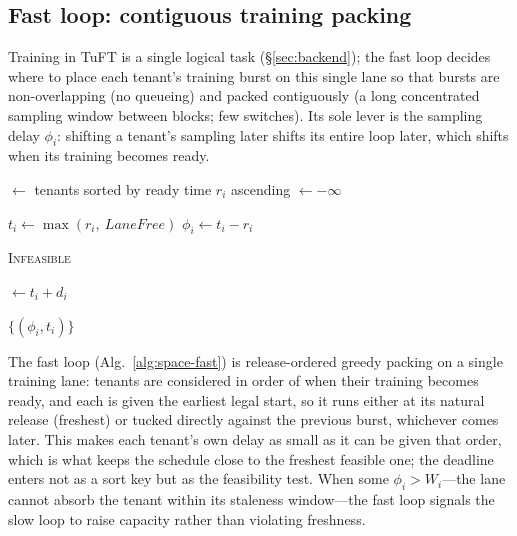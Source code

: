 \subsection{Fast loop: contiguous training packing}
\label{sec:sched:fast}

Training in TuFT is a single logical task (\S\ref{sec:backend}); the fast loop
decides where to place each tenant's training burst on this single lane so that
bursts are non-overlapping (no queueing) and packed contiguously (a long
concentrated sampling window between blocks; few switches). Its sole lever is
the sampling delay $\phi_i$: shifting a tenant's sampling later shifts its
entire loop later, which shifts when its training becomes ready.

\begin{algorithm}[t]
\small
\begin{algorithmic}[1]

         $\leftarrow$ tenants sorted by ready time $r_i$ ascending
         $\leftarrow -\infty$ 

            \State $t_i \leftarrow \max(r_i,\ \mathit{LaneFree})$ 
            \State $\phi_i \leftarrow t_i - r_i$ 

                \State \Return \textsc{Infeasible} 
            \EndIf

             $\leftarrow t_i + d_i$
        \EndFor

        \State \Return $\{(\phi_i, t_i)\}$
    \EndFunction

\end{algorithmic}
\caption{Fast loop: sampling-delay assignment.}
\label{alg:space-fast}
\end{algorithm}

The fast loop (Alg.~\ref{alg:space-fast}) is release-ordered greedy packing on a single
training lane: tenants are considered in order of when their training becomes ready, and
each is given the earliest legal start, so it runs either at its natural release
(freshest) or tucked directly against the previous burst, whichever comes later. This
makes each tenant's own delay as small as it can be given that order, which is what keeps
the schedule close to the freshest feasible one; the deadline enters not as a sort key but
as the feasibility test. When some $\phi_i > W_i$---the lane cannot absorb the tenant
within its staleness window---the fast loop signals the slow loop to raise capacity rather
than violating freshness.

